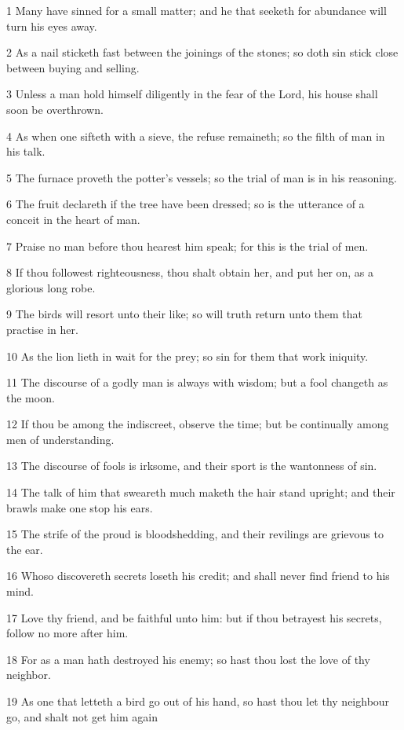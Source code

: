 \par 1 Many have sinned for a small matter; and he that seeketh for abundance will turn his eyes away.
\par 2 As a nail sticketh fast between the joinings of the stones; so doth sin stick close between buying and selling.
\par 3 Unless a man hold himself diligently in the fear of the Lord, his house shall soon be overthrown.
\par 4 As when one sifteth with a sieve, the refuse remaineth; so the filth of man in his talk.
\par 5 The furnace proveth the potter's vessels; so the trial of man is in his reasoning.
\par 6 The fruit declareth if the tree have been dressed; so is the utterance of a conceit in the heart of man.
\par 7 Praise no man before thou hearest him speak; for this is the trial of men.
\par 8 If thou followest righteousness, thou shalt obtain her, and put her on, as a glorious long robe.
\par 9 The birds will resort unto their like; so will truth return unto them that practise in her.
\par 10 As the lion lieth in wait for the prey; so sin for them that work iniquity.
\par 11 The discourse of a godly man is always with wisdom; but a fool changeth as the moon.
\par 12 If thou be among the indiscreet, observe the time; but be continually among men of understanding.
\par 13 The discourse of fools is irksome, and their sport is the wantonness of sin.
\par 14 The talk of him that sweareth much maketh the hair stand upright; and their brawls make one stop his ears.
\par 15 The strife of the proud is bloodshedding, and their revilings are grievous to the ear.
\par 16 Whoso discovereth secrets loseth his credit; and shall never find friend to his mind.
\par 17 Love thy friend, and be faithful unto him: but if thou betrayest his secrets, follow no more after him.
\par 18 For as a man hath destroyed his enemy; so hast thou lost the love of thy neighbor.
\par 19 As one that letteth a bird go out of his hand, so hast thou let thy neighbour go, and shalt not get him again
